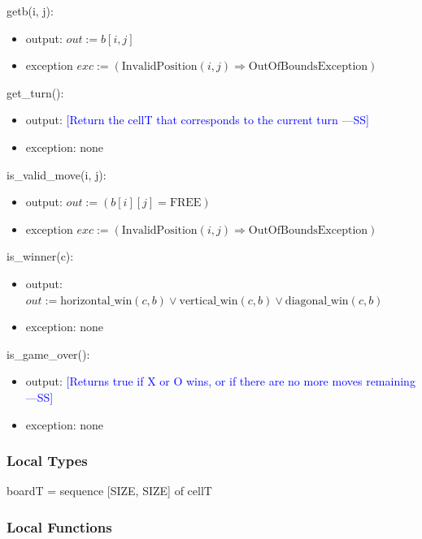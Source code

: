 \documentclass[12pt,fleqn]{examtst}
\newcommand{\authornote}[3]{\textcolor{#1}{[#3 ---#2]}}
\newcommand{\authornote}[3]{}
\newcommand{\wss}[1]{\authornote{blue}{SS}{#1}}
\begin{document}
\noindent getb(i, j):
\begin{itemize}
\item output: $\mathit{out} := b[i, j]$
\item exception
$exc := (\mbox{InvalidPosition}(i, j) \Rightarrow \mbox{OutOfBoundsException})$
\end{itemize}

\noindent get\_turn():
\begin{itemize}
\item output: \wss{Return the cellT that corresponds to the current turn}\\

\item exception: none
\end{itemize}

\noindent is\_valid\_move(i, j):
\begin{itemize}
\item output: $\mathit{out} := (b[i][j] = \mbox{FREE})$ 
\item exception $exc := (\mbox{InvalidPosition}(i, j) \Rightarrow \mbox{OutOfBoundsException})$
\end{itemize}

\noindent is\_winner(c):
\begin{itemize}
\item output: $\mathit{out} := \mbox{horizontal\_win}(c, b) \vee \mbox{vertical\_win}(c, b) \vee
\mbox{diagonal\_win}(c, b)$ 
\item exception: none
\end{itemize}

\noindent is\_game\_over():
\begin{itemize}
\item output: \wss{Returns true if X or O wins, or if there are no more moves remaining}\\

\item exception: none
\end{itemize}

\subsubsection* {Local Types}

boardT = sequence [SIZE, SIZE] of cellT

\subsubsection* {Local Functions}
\end{document}

